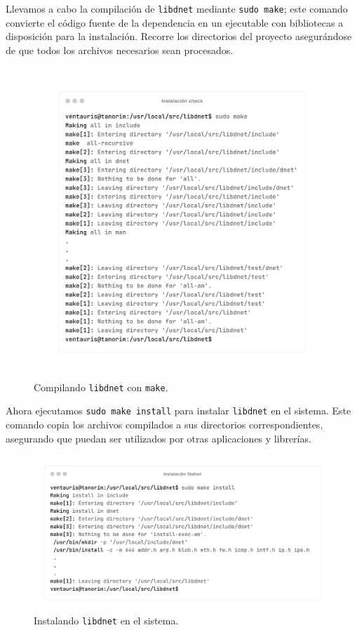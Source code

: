 \documentclass[11pt,a4paper,twoside]{report}
\begin{document}
\newpage

Llevamos a cabo la compilación de \texttt{libdnet} mediante \texttt{sudo make}; este comando convierte el código fuente de la dependencia en un ejecutable con bibliotecas a disposición para la instalación. Recorre los directorios del proyecto asegurándose de que todos los archivos necesarios sean procesados.

\begin{figure}[H]
	\centering
	\includegraphics[scale=0.12]{instalacion_snort/4-4.png}
	\caption{Compilando \texttt{libdnet} con \texttt{make}.}
\end{figure}


\newpage

Ahora ejecutamos \texttt{sudo make install} para instalar \texttt{libdnet} en el sistema. Este comando copia los archivos compilados a sus directorios correspondientes, asegurando que puedan ser utilizados por otras aplicaciones y librerías.

\begin{figure}[H]
	\centering
	\includegraphics[scale=0.12]{instalacion_snort/5-5.png}
	\caption{Instalando \texttt{libdnet} en el sistema.}
\end{figure}
\end{document}
